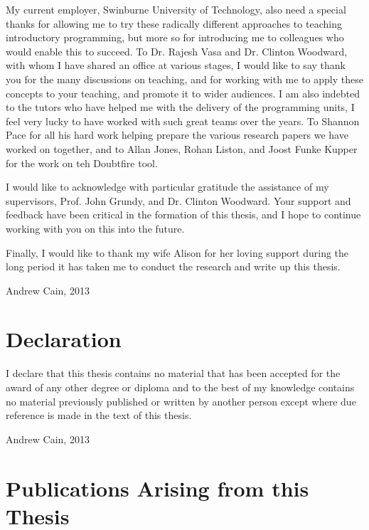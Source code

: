 My current employer, Swinburne University of Technology, also need a special thanks for allowing me to try these radically different approaches to teaching introductory programming, but more so for introducing me to colleagues who would enable this to succeed. To Dr. Rajesh Vasa and Dr. Clinton Woodward, with whom I have shared an office at various stages, I would like to say thank you for the many discussions on teaching, and for working with me to apply these concepts to your teaching, and promote it to wider audiences. I am also indebted to the tutors who have helped me with the delivery of the programming units, I feel very lucky to have worked with such great teams over the years. To Shannon Pace for all his hard work helping prepare the various research papers we have worked on together, and to Allan Jones, Rohan Liston, and Joost Funke Kupper for the work on teh Doubtfire tool. 

I would like to acknowledge with particular gratitude the assistance of my supervisors, Prof. John Grundy, and Dr. Clinton Woodward. Your support and feedback have been critical in the formation of this thesis, and I hope to continue working with you on this into the future.

Finally, I would like to thank my wife Alison for her loving support during the long period it has taken me to conduct the research and write up this thesis.

\vspace*{2cm}
Andrew Cain, 2013


\chapter*{Declaration}
I declare that this thesis contains no material that has been accepted for the award of any other degree or diploma and to the best of my knowledge contains no material previously published or written by another person except where due reference is made in the text of this thesis.

\vspace*{4cm} Andrew Cain, 2013
\chapter*{Publications Arising from this Thesis}
\vspace{-0.5cm}

